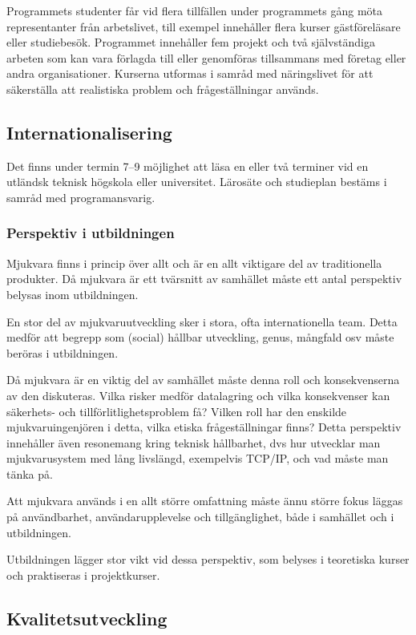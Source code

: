 Programmets studenter får vid flera tillfällen under programmets gång
möta representanter från arbetslivet, till exempel innehåller flera kurser
gästföreläsare eller studiebesök. Programmet innehåller fem projekt och
två självständiga arbeten som kan vara förlagda till eller genomföras
tillsammans med företag eller andra organisationer. Kurserna utformas i
samråd med näringslivet för att säkerställa att realistiska problem och
frågeställningar används.

\subsection*{Internationalisering}

Det finns under termin 7--9 möjlighet att läsa en eller två terminer vid
en utländsk teknisk högskola eller universitet. Lärosäte och studieplan
bestäms i samråd med programansvarig.

\subsubsection*{Perspektiv i utbildningen}

Mjukvara finns i princip över allt och är en allt viktigare del av traditionella produkter. Då mjukvara är
ett tvärsnitt av samhället måste ett antal perspektiv belysas inom
utbildningen.

En stor del av mjukvaruutveckling sker i stora, ofta internationella
team. Detta medför att begrepp som (social) hållbar utveckling, genus,
mångfald osv måste beröras i utbildningen.

Då mjukvara är en viktig del av samhället måste denna roll och
konsekvenserna av den diskuteras. Vilka risker medför datalagring
och vilka konsekvenser kan säkerhets- och tillförlitlighetsproblem få?
Vilken roll har den enskilde mjukvaruingenjören i detta, vilka etiska
frågeställningar finns? Detta perspektiv innehåller även resonemang
kring teknisk hållbarhet, dvs hur utvecklar man mjukvarusystem med lång
livslängd, exempelvis TCP/IP, och vad måste man tänka på.

Att mjukvara används i en allt större omfattning måste ännu större fokus
läggas på användbarhet, användarupplevelse och tillgänglighet, både i
samhället och i utbildningen.

Utbildningen lägger stor vikt vid dessa perspektiv, som belyses i
teoretiska kurser och praktiseras i projektkurser.

\subsection*{Kvalitetsutveckling}

